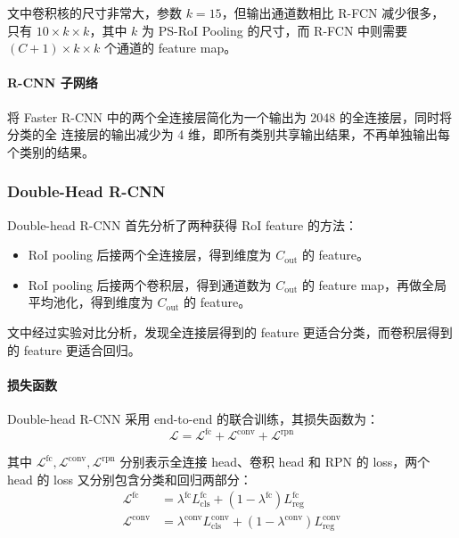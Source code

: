 文中卷积核的尺寸非常大，参数 $k=15$，但输出通道数相比 R-FCN 减少很多，只有 $10
\times k \times k$，其中 $k$ 为 PS-RoI Pooling 的尺寸，而 R-FCN 中则需要 $(C+1)
\times k \times k$ 个通道的 feature map。

\paragraph{R-CNN 子网络}
将 Faster R-CNN 中的两个全连接层简化为一个输出为 2048 的全连接层，同时将分类的全
连接层的输出减少为 4 维，即所有类别共享输出结果，不再单独输出每个类别的结果。

\subsubsection{Double-Head R-CNN}
Double-head R-CNN 首先分析了两种获得 RoI feature 的方法：

\begin{itemize}
  \item RoI pooling 后接两个全连接层，得到维度为 $C_{\mathrm{out}}$ 的 feature。
  \item RoI pooling 后接两个卷积层，得到通道数为 $C_{\mathrm{out}}$ 的 feature
    map，再做全局平均池化，得到维度为 $C_{\mathrm{out}}$ 的 feature。
\end{itemize}

文中经过实验对比分析，发现全连接层得到的 feature 更适合分类，而卷积层得到
的 feature 更适合回归。

\paragraph{损失函数}
Double-head R-CNN 采用 end-to-end 的联合训练，其损失函数为：
\begin{equation}
  \label{equ:double-head-loss}
  \mathcal{L} = \mathcal{L}^{\mathrm{fc}} + \mathcal{L}^{\mathrm{conv}} + \mathcal{L}^{\mathrm{rpn}}
\end{equation}

其中 $\mathcal{L}^{\mathrm{fc}}, \mathcal{L}^{\mathrm{conv}},
\mathcal{L}^{\mathrm{rpn}}$ 分别表示全连接 head、卷积 head 和 RPN 的 loss，两个
head 的 loss 又分别包含分类和回归两部分：
\begin{align}
  \label{equ:double-head-fc-loss}
  \mathcal{L}^{\mathrm{fc}} & = \lambda^{\mathrm{fc}}L_{\mathrm{cls}}^{\mathrm{fc}} + (1-\lambda^{\mathrm{fc}})L_{\mathrm{reg}}^{\mathrm{fc}} \\
  \label{equ:double-head-conv-loss}
  \mathcal{L}^{\mathrm{conv}} & = \lambda^{\mathrm{conv}}L_{\mathrm{cls}}^{\mathrm{conv}} + (1-\lambda^{\mathrm{conv}})L_{\mathrm{reg}}^{\mathrm{conv}}
\end{align}

